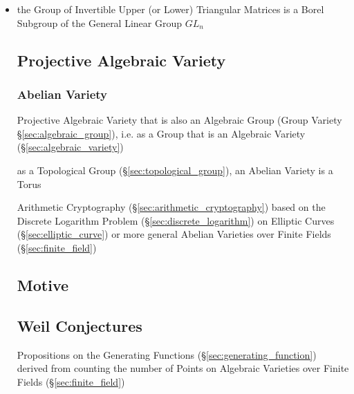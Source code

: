 \begin{itemize}
  \item the Group of Invertible Upper (or Lower) Triangular Matrices is a Borel
    Subgroup of the General Linear Group $GL_n$
\begin{itemize}



\subsection{Projective Algebraic Variety}
\label{sec:projective_algebraic_variety}

\subsubsection{Abelian Variety}\label{sec:abelian_variety}

Projective Algebraic Variety that is also an Algebraic Group (Group Variety
\S\ref{sec:algebraic_group}), i.e. as a Group that is an Algebraic Variety
(\S\ref{sec:algebraic_variety})

as a Topological Group (\S\ref{sec:topological_group}), an Abelian Variety is a
Torus %

\fist Arithmetic Cryptography (\S\ref{sec:arithmetic_cryptography}) based on
the Discrete Logarithm Problem (\S\ref{sec:discrete_logarithm}) on Elliptic
Curves (\S\ref{sec:elliptic_curve}) or more general Abelian Varieties over
Finite Fields (\S\ref{sec:finite_field})



\subsection{Motive}\label{sec:motive}

\subsection{Weil Conjectures}\label{sec:weil_conjectures}

Propositions on the Generating Functions (\S\ref{sec:generating_function})
derived from counting the number of Points on Algebraic Varieties over Finite
Fields (\S\ref{sec:finite_field})




\end{itemize}
\end{itemize}
